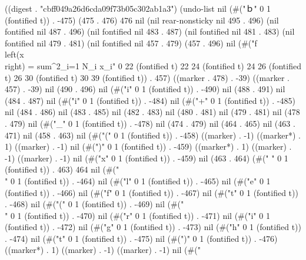 
((digest . "cbff049a26d6cda09f73b05c302ab1a3") (undo-list nil (#("ｂ" 0 1 (fontified t)) . -475) (475 . 476) 476 nil (nil rear-nonsticky nil 495 . 496) (nil fontified nil 487 . 496) (nil fontified nil 483 . 487) (nil fontified nil 481 . 483) (nil fontified nil 479 . 481) (nil fontified nil 457 . 479) (457 . 496) nil (#("f\\left(x\\right) = sum^{2}_{i=1} N_i x_i" 0 22 (fontified t) 22 24 (fontified t) 24 26 (fontified t) 26 30 (fontified t) 30 39 (fontified t)) . 457) ((marker . 478) . -39) ((marker . 457) . -39) nil (490 . 496) nil (#("i" 0 1 (fontified t)) . -490) nil (488 . 491) nil (484 . 487) nil (#("i" 0 1 (fontified t)) . -484) nil (#("+" 0 1 (fontified t)) . -485) nil (484 . 486) nil (483 . 485) nil (482 . 483) nil (480 . 481) nil (479 . 481) nil (478 . 479) nil (#("_" 0 1 (fontified t)) . -478) nil (474 . 479) nil (464 . 465) nil (463 . 471) nil (458 . 463) nil (#("(" 0 1 (fontified t)) . -458) ((marker) . -1) ((marker*) . 1) ((marker) . -1) nil (#(")" 0 1 (fontified t)) . -459) ((marker*) . 1) ((marker) . -1) ((marker) . -1) nil (#("x" 0 1 (fontified t)) . -459) nil (463 . 464) (#(" " 0 1 (fontified t)) . 463) 464 nil (#("\\" 0 1 (fontified t)) . -464) nil (#("l" 0 1 (fontified t)) . -465) nil (#("e" 0 1 (fontified t)) . -466) nil (#("f" 0 1 (fontified t)) . -467) nil (#("t" 0 1 (fontified t)) . -468) nil (#("(" 0 1 (fontified t)) . -469) nil (#("\\" 0 1 (fontified t)) . -470) nil (#("r" 0 1 (fontified t)) . -471) nil (#("i" 0 1 (fontified t)) . -472) nil (#("g" 0 1 (fontified t)) . -473) nil (#("h" 0 1 (fontified t)) . -474) nil (#("t" 0 1 (fontified t)) . -475) nil (#(")" 0 1 (fontified t)) . -476) ((marker*) . 1) ((marker) . -1) ((marker) . -1) nil (#("
